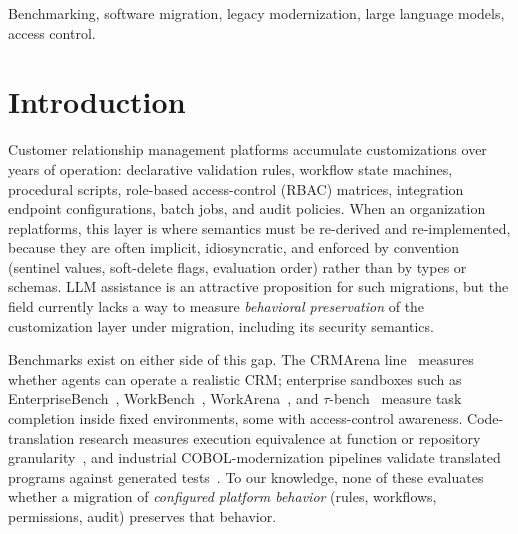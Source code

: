 \documentclass[journal]{IEEEtran}
\begin{document}
\begin{IEEEkeywords}
Benchmarking, software migration, legacy modernization, large language models, access control.
\end{IEEEkeywords}

\section{Introduction}
\label{sec:intro}
Customer relationship management platforms accumulate customizations over years of operation:
declarative validation rules, workflow state machines, procedural scripts, role-based
access-control (RBAC) matrices, integration endpoint configurations, batch jobs, and audit
policies. When an organization replatforms, this layer is where semantics must be re-derived
and re-implemented, because they are often implicit, idiosyncratic, and enforced by convention
(sentinel values, soft-delete flags, evaluation order) rather than by types or schemas. LLM assistance is an
attractive proposition for such migrations, but the field currently lacks a way to measure
\emph{behavioral preservation} of the customization layer under migration, including its
security semantics.

Benchmarks exist on either side of this gap. The CRMArena line~\cite{huang2025crmarena,
huang2025crmarenapro} measures whether agents can operate a realistic CRM; enterprise sandboxes
such as EnterpriseBench~\cite{vishwakarma2025enterprisebench}, WorkBench~\cite{styles2024workbench},
WorkArena~\cite{drouin2024workarena}, and $\tau$-bench~\cite{yao2024taubench} measure task
completion inside fixed environments, some with access-control awareness. Code-translation
research measures execution equivalence at function or repository
granularity~\cite{lachaux2020transcoder, yan2023codetransocean, pan2024lost,
ibrahimzada2025alphatrans}, and industrial COBOL-modernization pipelines validate translated
programs against generated tests~\cite{hans2025coboltesting, kumar2025cobolvalidation,
froimovich2025cobolquality}. To our knowledge, none of these evaluates whether a migration of \emph{configured
platform behavior} (rules, workflows, permissions, audit) preserves that behavior.
\end{document}
